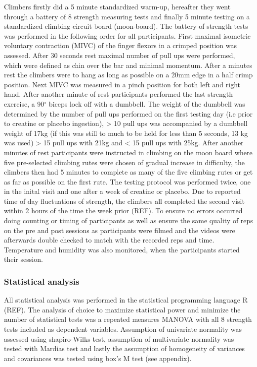 \documentclass[
]{article}
\begin{document}
Climbers firstly did a 5 minute standardized warm-up, hereafter they
went through a battery of 8 strength measuring tests and finally 5
minute testing on a standardized climbing circuit board (moon-board).
The battery of strength tests was performed in the following order for
all participants. First maximal isometric voluntary contraction (MIVC)
of the finger flexors in a crimped position was assessed. After 30
seconds rest maximal number of pull ups were performed, which were
defined as chin over the bar and minimal momentum. After a minutes rest
the climbers were to hang as long as possible on a 20mm edge in a half
crimp position. Next MIVC was measured in a pinch position for both left
and right hand. After another minute of rest participants performed the
last strength exercise, a 90\(^{\circ}\) biceps lock off with a
dumbbell. The weight of the dumbbell was determined by the number of
pull ups performed on the first testing day (i.e prior to creatine or
placebo ingestion), \textgreater{} 10 pull ups was accompanied by a
dumbbell weight of 17kg (if this was still to much to be held for less
than 5 seconds, 13 kg was used) \textgreater{} 15 pull ups with 21kg and
\textless{} 15 pull ups with 25kg. After another minutes of rest
participants were instructed in climbing on the moon board where five
pre-selected climbing rutes were chosen of gradual increase in
difficulty, the climbers then had 5 minutes to complete as many of the
five climbing rutes or get as far as possible on the first rute. The
testing protocol was performed twice, one in the inital visit and one
after a week of creatine or placebo. Due to reported time of day
fluctuations of strength, the climbers all completed the second visit
within 2 hours of the time the week prior (REF). To ensure no errors
occurred doing counting or timing of participants as well as ensure the
same quality of reps on the pre and post sessions as participants were
filmed and the videos were afterwards double checked to match with the
recorded reps and time. Temperature and humidity was also monitored,
when the participants started their session.

\hypertarget{statistical-analysis}{%
\subsubsection{\texorpdfstring{\textbf{Statistical
analysis}}{Statistical analysis}}\label{statistical-analysis}}

All statistical analysis was performed in the statistical programming
language R (REF). The analysis of choice to maximize statistical power
and minimize the number of statistical tests was a repeated measures
MANOVA with all 8 strength tests included as dependent variables.
Assumption of univariate normality was assessed using shapiro-Wilks
test, assumption of multivariate normality was tested with Mardias test
and lastly the assumption of homogeneity of variances and covariances
was tested using box's M test (see appendix).
\end{document}
